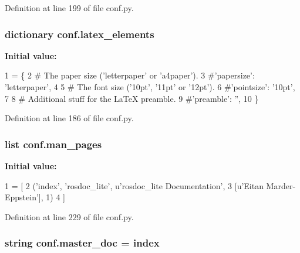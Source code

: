 Definition at line 199 of file conf.\+py.

\subsubsection[{\texorpdfstring{latex\+\_\+elements}{latex_elements}}]{\setlength{\rightskip}{0pt plus 5cm}dictionary conf.\+latex\+\_\+elements}\hypertarget{namespaceconf_a33619d385ad23765ac6ebb58bf82d43d}{}\label{namespaceconf_a33619d385ad23765ac6ebb58bf82d43d}
{\bfseries Initial value\+:}
\begin{DoxyCode}
1 = \{
2 \textcolor{comment}{# The paper size ('letterpaper' or 'a4paper').}
3 \textcolor{comment}{#'papersize': 'letterpaper',}
4 
5 \textcolor{comment}{# The font size ('10pt', '11pt' or '12pt').}
6 \textcolor{comment}{#'pointsize': '10pt',}
7 
8 \textcolor{comment}{# Additional stuff for the LaTeX preamble.}
9 \textcolor{comment}{#'preamble': '',}
10 \}
\end{DoxyCode}


Definition at line 186 of file conf.\+py.

\subsubsection[{\texorpdfstring{man\+\_\+pages}{man_pages}}]{\setlength{\rightskip}{0pt plus 5cm}list conf.\+man\+\_\+pages}\hypertarget{namespaceconf_a85efc5fee48a26fa2d651f6eeb38fc2b}{}\label{namespaceconf_a85efc5fee48a26fa2d651f6eeb38fc2b}
{\bfseries Initial value\+:}
\begin{DoxyCode}
1 = [
2     (\textcolor{stringliteral}{'index'}, \textcolor{stringliteral}{'rosdoc\_lite'}, \textcolor{stringliteral}{u'rosdoc\_lite Documentation'},
3      [\textcolor{stringliteral}{u'Eitan Marder-Eppstein'}], 1)
4 ]
\end{DoxyCode}


Definition at line 229 of file conf.\+py.

\subsubsection[{\texorpdfstring{master\+\_\+doc}{master_doc}}]{\setlength{\rightskip}{0pt plus 5cm}string conf.\+master\+\_\+doc = \textquotesingle{}index\textquotesingle{}}\hypertarget{namespaceconf_a6fcd7e5236f355b1e1a55f9d95988810}{}\label{namespaceconf_a6fcd7e5236f355b1e1a55f9d95988810}


